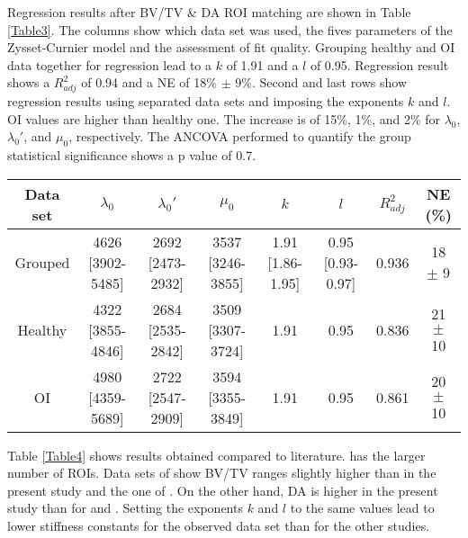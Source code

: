 \documentclass[a4paper,fleqn]{DC_ArtStyle}
\begin{document}
Regression results after BV/TV \& DA ROI matching are shown in Table \ref{Table3}. The columns show which data set was used, the fives parameters of the Zysset-Curnier model and the assessment of fit quality. Grouping healthy and OI data together for regression lead to a $k$ of 1.91 and a $l$ of 0.95. Regression result shows a $R^2_{adj}$ of 0.94 and a NE of 18\% $\pm$ 9\%. Second and last rows show regression results using separated data sets and imposing the exponents $k$ and $l$. OI values are higher than healthy one. The increase is of 15\%, 1\%, and 2\% for $\lambda_0$, $\lambda_0'$, and $\mu_0$, respectively. The ANCOVA performed to quantify the group statistical significance shows a p value of 0.7.\\

\begin{table*}[b]
	\caption{Constants obtained with BV/TV and DA matched data sets. Comparison is performed between grouped (N ROIs = 166) and separated data sets (N ROIs = 83). Values are presented as value [95\% CI] or mean $\pm$ standard deviation.}
	\label{Table3}
	\begin{tabular}{cccccccc}
		\toprule
		Data set & $\lambda_0$ & $\lambda_0'$ & $\mu_0$ & $k$ & $l$ & $R^2_{adj}$ & NE (\%) \\
		\midrule
		Grouped & 4626 [3902-5485] & 2692 [2473-2932] & 3537 [3246-3855] & 1.91 [1.86-1.95] & 0.95 [0.93-0.97] & 0.936 & 18 $\pm$ 9\\
		
		Healthy & 4322 [3855-4846] & 2684 [2535-2842] & 3509 [3307-3724] & 1.91 & 0.95 & 0.836 & 21 $\pm$ 10\\
		
		OI & 4980 [4359-5689] & 2722 [2547-2909] & 3594 [3355-3849] & 1.91 & 0.95 & 0.861 & 20 $\pm$ 10\\
		\bottomrule
	\end{tabular}
\end{table*}

Table \ref{Table4} shows results obtained compared to literature. \citeauthor{Gross2013} \cite{Gross2013} has the larger number of ROIs. Data sets of \citeauthor{Panyasantisuk2015} \cite{Panyasantisuk2015} show BV/TV ranges slightly higher than in the present study and the one of \citeauthor{Gross2013} \cite{Gross2013}. On the other hand, DA is higher in the present study than for \citeauthor{Panyasantisuk2015} \cite{Panyasantisuk2015} and \citeauthor{Gross2013} \cite{Gross2013}. Setting the exponents $k$ and $l$ to the same values lead to lower stiffness constants for the observed data set than for the other studies.\\
\end{document}
